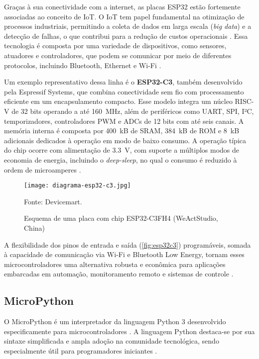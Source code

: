 Graças à sua conectividade com a internet, as placas ESP32 estão fortemente associadas ao conceito de IoT. O IoT tem papel fundamental na otimização de processos industriais, permitindo a coleta de dados em larga escala (\textit{big data}) e a detecção de falhas, o que contribui para a redução de custos operacionais \cite{ferencz2020rapid}. Essa tecnologia é composta por uma variedade de dispositivos, como sensores, atuadores e controladores, que podem se comunicar por meio de diferentes protocolos, incluindo Bluetooth, Ethernet e Wi-Fi \cite{shinde2017industrial}.

Um exemplo representativo dessa linha é o \textbf{ESP32-C3}, também desenvolvido pela Espressif Systems, que combina conectividade sem fio com processamento eficiente em um encapsulamento compacto. Esse modelo integra um núcleo RISC-V de 32 bits operando a até 160~MHz, além de periféricos como UART, SPI, I²C, temporizadores, controladores PWM e ADCs de 12 bits com até seis canais. A memória interna é composta por 400~kB de SRAM, 384~kB de ROM e 8~kB adicionais dedicados à operação em modo de baixo consumo. A operação típica do chip ocorre com alimentação de 3.3~V, com suporte a múltiplos modos de economia de energia, incluindo o \textit{deep-sleep}, no qual o consumo é reduzido à ordem de microamperes \cite{espressif_esp32c3_2025}.

\begin{figure}[ht]
    \centering
    \caption{Esquema de uma placa com chip ESP32-C3FH4 (WeActStudio, China) }
    \label{fig:esp32c3}
    \texttt{[image: diagrama-esp32-c3.jpg]}

    {\centering\footnotesize Fonte: Devicemart.\par}
\end{figure}

A flexibilidade dos pinos de entrada e saída (\autoref{fig:esp32c3}) programáveis, somada à capacidade de comunicação via Wi-Fi e Bluetooth Low Energy, tornam esses microcontroladores uma alternativa robusta e econômica para aplicações embarcadas em automação, monitoramento remoto e sistemas de controle \cite{espressif_esp32c3_2025}.


\subsection{MicroPython}

O MicroPython é um interpretador da linguagem Python 3 desenvolvido especificamente para microcontroladores \cite{PLAUSKA2022}. A linguagem Python destaca-se por sua sintaxe simplificada e ampla adoção na comunidade tecnológica, sendo especialmente útil para programadores iniciantes \cite{TOLLERVEY2017}.

